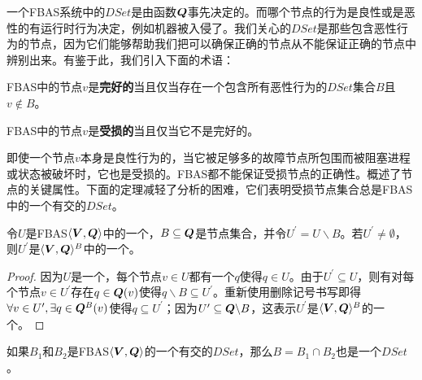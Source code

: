 一个FBAS系统中的$DSet$是由{\quorum}函数${\bm Q}$事先决定的。而哪个节点的行为是良性或是恶性的有运行时行为决定，例如机器被入侵了。我们关心的$DSet$是那些包含恶性行为的节点，因为它们能够帮助我们把可以确保正确的节点从不能保证正确的节点中辨别出来。有鉴于此，我们引入下面的术语：

\begin{definition}[完好的]
	FBAS中的节点$v$是\textbf{完好的}当且仅当存在一个包含所有恶性行为的$DSet$集合$B$且$v\not\in B$。
\end{definition}

\begin{definition}[受损的]
	FBAS中的节点$v$是\textbf{受损的}当且仅当它不是完好的。
\end{definition}

即使一个节点$v$本身是良性行为的，当它被足够多的故障节点所包围而被阻塞进程或状态被破坏时，它也是受损的。FBAS都不能保证受损节点的正确性。概述了节点的关键属性。下面的定理减轻了分析的困难，它们表明受损节点集合总是FBAS中的一个有{\quorum}交的$DSet$。

\begin{theorem}\label{th1}
	令$U$是FBAS$\langle{\bm V},{\bm Q}\rangle$中的一个{\quorum}，$B\subseteq {\bm Q}$是节点集合，并令$U^\prime=U\backslash B$。若$U^\prime\neq \emptyset$，则$U^\prime$是$\langle{\bm V},{\bm Q}\rangle^B$中的一个{\quorum}。
\end{theorem}

\begin{proof}
	因为$U$是一个{\quorum}，每个节点$v\in U$都有一个$q$使得$q\in U$。由于$U^\prime\subseteq U$，则有对每个节点$v\in U^\prime$存在$q\in{\bm Q}(v)$使得$q\backslash B\subseteq U^\prime$。重新使用删除记号书写即得$\forall v\in U^\prime,\exists q\in{\bm Q}^B(v)$使得$q\subseteq U^\prime$；因为$U^\prime \subseteq {\bm Q}\backslash B$，这表示$U^\prime$是$\langle{\bm V},{\bm Q}\rangle^B$的一个{\quorum}。
\end{proof}

\begin{theorem}\label{th2}
	如果$B_1$和$B_2$是FBAS$\langle{\bm V},{\bm Q}\rangle$的一个有{\quorum}交的$DSet$，那么$B=B_1\cap B_2$也是一个$DSet$。
\end{theorem}

